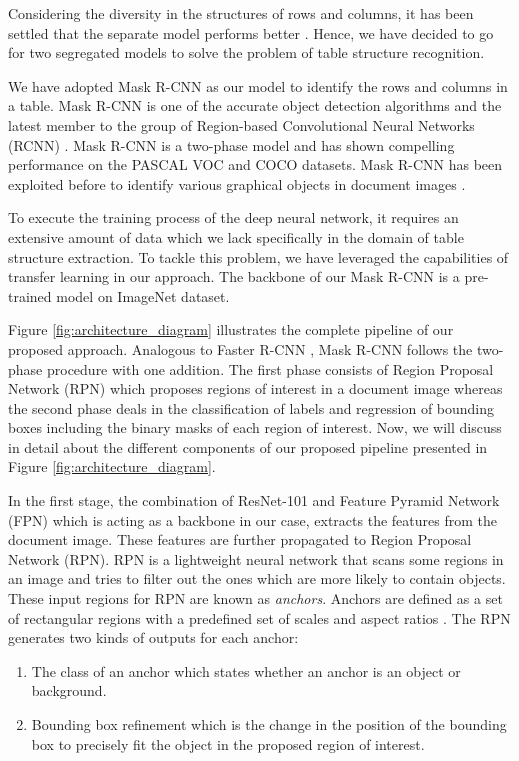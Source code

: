 \documentclass{ieeeaccess}
\begin{document}
Considering the diversity in the structures of rows and columns, it has been settled that the separate model performs better \cite{b33}. Hence, we have decided to go for two segregated models to solve the problem of table structure recognition. 


We have adopted Mask R-CNN \cite{b36} as our model to identify the rows and columns in a table. Mask R-CNN is one of the accurate object detection algorithms and the latest member to the group of Region-based Convolutional Neural Networks (RCNN) \cite{b44}. Mask R-CNN is a two-phase model and has shown compelling performance on the PASCAL VOC \cite{b45} and COCO \cite{b46} datasets. Mask R-CNN has been exploited before to identify various graphical objects in document images \cite{b48}. 

To execute the training process of the deep neural network, it requires an extensive amount of data which we lack specifically in the domain of table structure extraction. To tackle this problem, we have leveraged the capabilities of transfer learning in our approach. The backbone of our Mask R-CNN is a  pre-trained model on ImageNet \cite{b47} dataset. 

Figure \ref{fig:architecture_diagram} illustrates the complete pipeline of our proposed approach. Analogous to Faster R-CNN \cite{b34}, Mask R-CNN \cite{b36} follows the two-phase procedure with one addition. The first phase consists of Region Proposal Network (RPN) which proposes regions of interest in a document image whereas the second phase deals in the classification of labels and regression of bounding boxes including the binary masks of each region of interest. Now, we will discuss in detail about the different components of our proposed pipeline presented in Figure \ref{fig:architecture_diagram}.

In the first stage, the combination of ResNet-101 \cite{b49} and Feature Pyramid Network (FPN) \cite{b50} which is acting as a backbone in our case, extracts the features from the document image. These features are further propagated to Region Proposal Network (RPN). RPN is a lightweight neural network that scans some regions in an image and tries to filter out the ones which are more likely to contain objects. These input regions for RPN are known as \textit{anchors}. Anchors are defined as a set of rectangular regions with a predefined set of scales and aspect ratios \cite{b59}. The RPN generates two kinds of outputs for each anchor: 
\begin{enumerate}
    \item The class of an anchor which states whether an anchor is an object or background.
    \item Bounding box refinement which is the change in the position of the bounding box to precisely fit the object in the proposed region of interest.
\end{enumerate}
 
\end{document}
